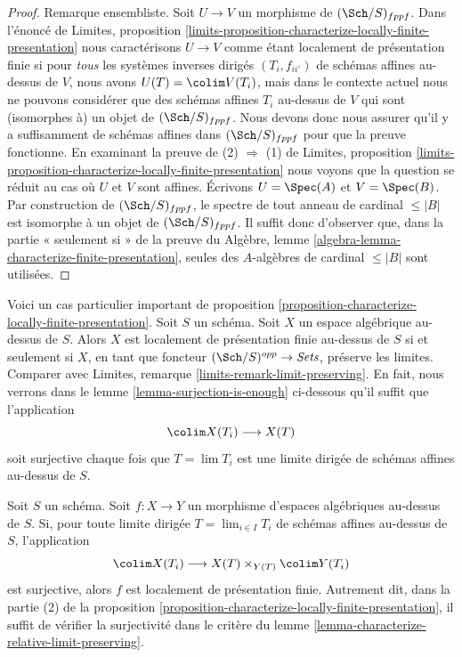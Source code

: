 \begin{proof}
\medskip\noindent
Remarque ensembliste. Soit $U \to V$ un morphisme de
$(\Sch/S)_{fppf}$. Dans l'énoncé de
Limites, proposition
\ref{limits-proposition-characterize-locally-finite-presentation}
nous caractérisons $U \to V$ comme étant localement de présentation finie
si pour {\it tous} les systèmes inverses dirigés $(T_i, f_{ii'})$ de schémas affines
au-dessus de $V$, nous avons $U(T) = \colim V(T_i)$, mais dans le contexte actuel
nous ne pouvons considérer que des schémas affines $T_i$ au-dessus de $V$ qui sont (isomorphes à)
un objet de $(\Sch/S)_{fppf}$. Nous devons donc nous assurer qu'il y a suffisamment
de schémas affines dans $(\Sch/S)_{fppf}$ pour que la preuve fonctionne.
En examinant la preuve de (2) $\Rightarrow$ (1) de
Limites, proposition
\ref{limits-proposition-characterize-locally-finite-presentation}
nous voyons que la question se réduit au cas où $U$ et $V$ sont affines.
Écrivons $U = \Spec(A)$ et $V = \Spec(B)$. Par construction
de $(\Sch/S)_{fppf}$, le spectre de tout anneau de cardinal
$\leq |B|$ est isomorphe à un objet de $(\Sch/S)_{fppf}$.
Il suffit donc d'observer que, dans la partie « seulement si » de la preuve du
Algèbre, lemme \ref{algebra-lemma-characterize-finite-presentation},
seules des $A$-algèbres de cardinal $\leq |B|$ sont utilisées.
\end{proof}

\begin{remark}
\label{remark-limit-preserving}
Voici un cas particulier important de
proposition \ref{proposition-characterize-locally-finite-presentation}.
Soit $S$ un schéma. Soit $X$ un espace algébrique au-dessus de $S$.
Alors $X$ est localement de présentation finie au-dessus de $S$ si et seulement
si $X$, en tant que foncteur $(\Sch/S)^{opp} \to \textit{Sets}$,
préserve les limites. Comparer avec
Limites, remarque \ref{limits-remark-limit-preserving}.
En fait, nous verrons dans le lemme \ref{lemma-surjection-is-enough}
ci-dessous qu'il suffit que l'application
$$
\colim X(T_i) \longrightarrow X(T)
$$
soit surjective chaque fois que $T = \lim T_i$ est une limite dirigée de
schémas affines au-dessus de $S$.
\end{remark}

\begin{lemma}
\label{lemma-surjection-is-enough}
Soit $S$ un schéma.
Soit $f : X \to Y$ un morphisme d'espaces algébriques au-dessus de $S$.
Si, pour toute limite dirigée $T = \lim_{i \in I} T_i$
de schémas affines au-dessus de $S$, l'application
$$
\colim X(T_i) \longrightarrow X(T) \times_{Y(T)} \colim Y(T_i)
$$
est surjective, alors $f$ est localement de présentation finie.
Autrement dit, dans la partie (2) de la
proposition \ref{proposition-characterize-locally-finite-presentation},
il suffit de vérifier la surjectivité dans le critère du
lemme \ref{lemma-characterize-relative-limit-preserving}.
\end{lemma}

